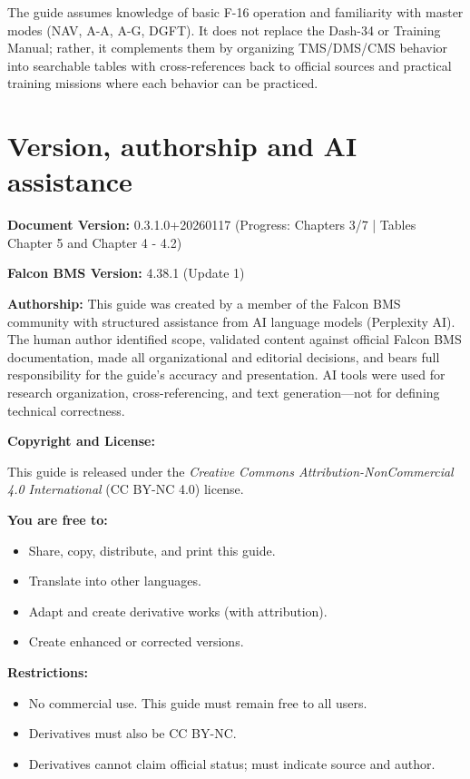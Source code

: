 \documentclass[11pt, a4paper, twoside]{report}
\newcommand{\docversion}{0.3.1.0}
\newcommand{\docbuild}{20260117}
\newcommand{\chapterscompletedof}{3/7}
\newcommand{\tablesfilledpct}{Chapter 5 and Chapter 4 - 4.2}
\newcommand{\fulldocversion}{\docversion+\docbuild}
\begin{document}
The guide assumes knowledge of basic F-16 operation and familiarity with master modes (NAV, A-A, A-G, DGFT). It does not replace the Dash-34 or Training Manual; rather, it complements them by organizing TMS/DMS/CMS behavior into searchable tables with cross-references back to official sources and practical training missions where each behavior can be practiced.

\section{Version, authorship and AI assistance}

\label{sec:C1-S3}

\textbf{Document Version:} \fulldocversion{} (Progress: Chapters \chapterscompletedof{} | Tables \tablesfilledpct)

\textbf{Falcon BMS Version:} 4.38.1 (Update 1)

\textbf{Authorship:} This guide was created by a member of the Falcon BMS community with structured assistance from AI language models (Perplexity AI). The human author identified scope, validated content against official Falcon BMS documentation, made all organizational and editorial decisions, and bears full responsibility for the guide's accuracy and presentation. AI tools were used for research organization, cross-referencing, and text generation---not for defining technical correctness.

\textbf{Copyright and License:}

This guide is released under the \textit{Creative Commons Attribution-NonCommercial 4.0 International} (CC BY-NC 4.0) license.

\textbf{You are free to:}

\begin{itemize}
  \item Share, copy, distribute, and print this guide.
  \item Translate into other languages.
  \item Adapt and create derivative works (with attribution).
  \item Create enhanced or corrected versions.
\end{itemize}

\textbf{Restrictions:}

\begin{itemize}
  \item No commercial use. This guide must remain free to all users.
  \item Derivatives must also be CC BY-NC.
  \item Derivatives cannot claim official status; must indicate source and author.
\end{itemize}
\end{document}
